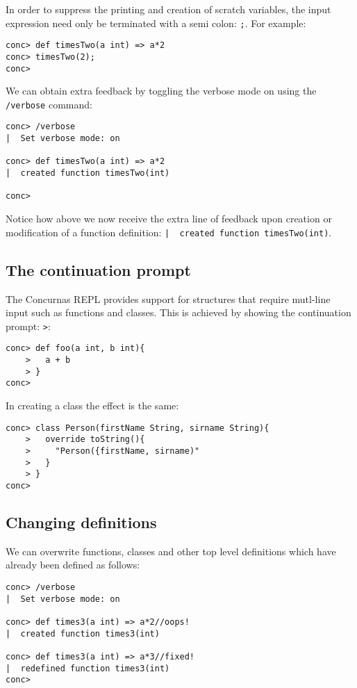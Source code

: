 \documentclass[conc-doc]{subfiles}
\begin{document}
In order to suppress the printing and creation of scratch variables, the input expression need only be terminated with a semi colon: \lstinline[language=None]{;}. For example:

\begin{lstlisting}[language=None]
conc> def timesTwo(a int) => a*2
conc> timesTwo(2);
conc> 
\end{lstlisting}

We can obtain extra feedback by toggling the verbose mode on using the \lstinline[language=None]{/verbose} command:

\begin{lstlisting}[language=None]
conc> /verbose
|  Set verbose mode: on

conc> def timesTwo(a int) => a*2
|  created function timesTwo(int)

conc>
\end{lstlisting}

Notice how above we now receive the extra line of feedback upon creation or modification of a function definition: \lstinline[language=None]{|  created function timesTwo(int)}.
	
\subsection{The continuation prompt}
The Concurnas REPL provides support for structures that require mutl-line input such as functions and classes. This is achieved by showing the continuation prompt: \lstinline[language=None]{>}:

\begin{lstlisting}[language=None]
conc> def foo(a int, b int){
    >   a + b
    > }
conc> 
\end{lstlisting}

In creating a class the effect is the same:
\begin{lstlisting}[language=None]
conc> class Person(firstName String, sirname String){
    >   override toString(){
    >     "Person({firstName, sirname)"
    >   }
    > }
conc> 
\end{lstlisting}

\subsection{Changing definitions}
We can overwrite functions, classes and other top level definitions which have already been defined as follows:

\begin{lstlisting}[language=None]
conc> /verbose
|  Set verbose mode: on

conc> def times3(a int) => a*2//oops!
|  created function times3(int)

conc> def times3(a int) => a*3//fixed!
|  redefined function times3(int)
conc> 
\end{lstlisting}
\end{document}

